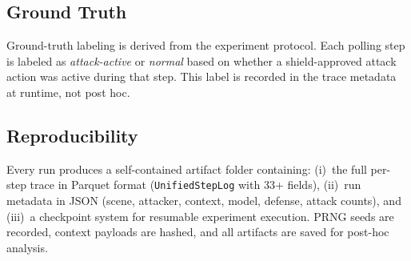 \subsection{Ground Truth}
\label{sec:methodology:gt}
Ground-truth labeling is derived from the experiment protocol. Each polling step is labeled as \emph{attack-active} or \emph{normal} based on whether a shield-approved attack action was active during that step. This label is recorded in the trace metadata at runtime, not post hoc.

\subsection{Reproducibility}
\label{sec:methodology:reproducibility}
Every run produces a self-contained artifact folder containing: (i)~the full per-step trace in Parquet format (\texttt{UnifiedStepLog} with 33+ fields), (ii)~run metadata in JSON (scene, attacker, context, model, defense, attack counts), and (iii)~a checkpoint system for resumable experiment execution. PRNG seeds are recorded, context payloads are hashed, and all artifacts are saved for post-hoc analysis.
